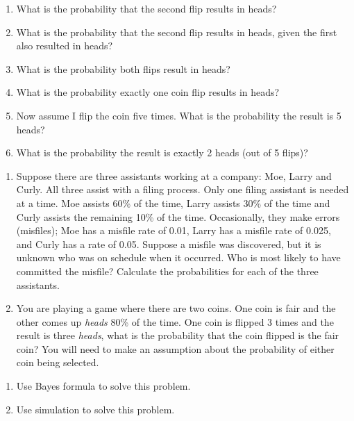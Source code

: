\documentclass[
  letterpaper,
  DIV=11,
  numbers=noendperiod]{scrreprt}
\providecommand{\tightlist}{%
  \setlength{\itemsep}{0pt}\setlength{\parskip}{0pt}}\usepackage{longtable,booktabs,array}
\begin{document}
\begin{enumerate}
\def\labelenumi{\alph{enumi}.}
\tightlist
\item
  What is the probability that the second flip results in heads?\\
\item
  What is the probability that the second flip results in heads, given
  the first also resulted in heads?\\
\item
  What is the probability both flips result in heads?\\
\item
  What is the probability exactly one coin flip results in heads?\\
\item
  Now assume I flip the coin five times. What is the probability the
  result is 5 heads?\\
\item
  What is the probability the result is exactly 2 heads (out of 5
  flips)?
\end{enumerate}

\begin{enumerate}
\def\labelenumi{\arabic{enumi}.}
\setcounter{enumi}{2}
\item
  Suppose there are three assistants working at a company: Moe, Larry
  and Curly. All three assist with a filing process. Only one filing
  assistant is needed at a time. Moe assists 60\% of the time, Larry
  assists 30\% of the time and Curly assists the remaining 10\% of the
  time. Occasionally, they make errors (misfiles); Moe has a misfile
  rate of 0.01, Larry has a misfile rate of 0.025, and Curly has a rate
  of 0.05. Suppose a misfile was discovered, but it is unknown who was
  on schedule when it occurred. Who is most likely to have committed the
  misfile? Calculate the probabilities for each of the three assistants.
\item
  You are playing a game where there are two coins. One coin is fair and
  the other comes up \emph{heads} 80\% of the time. One coin is flipped
  3 times and the result is three \emph{heads}, what is the probability
  that the coin flipped is the fair coin? You will need to make an
  assumption about the probability of either coin being selected.
\end{enumerate}

\begin{enumerate}
\def\labelenumi{\alph{enumi}.}
\tightlist
\item
  Use Bayes formula to solve this problem.\\
\item
  Use simulation to solve this problem.
\end{enumerate}
\end{document}
